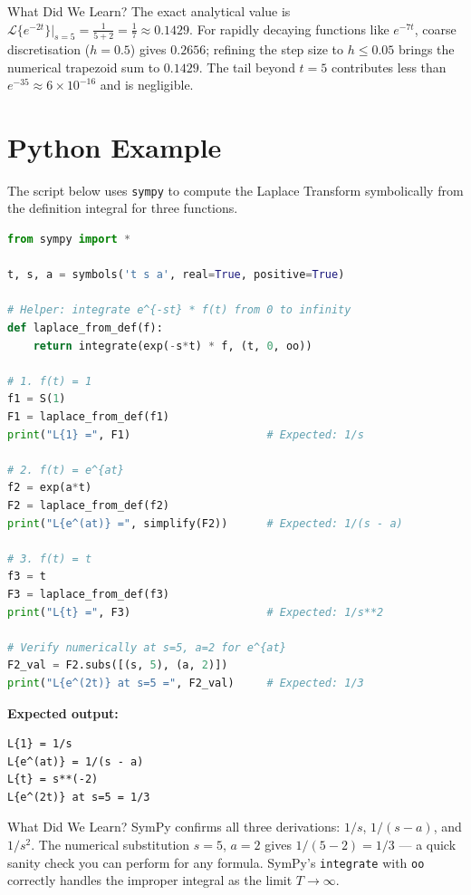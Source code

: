 \documentclass[12pt,a4paper]{article}
\begin{document}
\begin{learnbox}{What Did We Learn?}
The exact analytical value is $\mathcal{L}\{e^{-2t}\}\big|_{s=5} = \frac{1}{5+2} = \frac{1}{7} \approx 0.1429$.
For rapidly decaying functions like $e^{-7t}$, coarse discretisation ($h = 0.5$) gives $0.2656$; refining the step size to $h \le 0.05$ brings the numerical trapezoid sum to $0.1429$. The tail beyond $t = 5$ contributes less than $e^{-35} \approx 6 \times 10^{-16}$ and is negligible.
\end{learnbox}

\section{Python Example}

The script below uses \texttt{sympy} to compute the Laplace Transform
symbolically from the definition integral for three functions.

\begin{lstlisting}[language=Python, caption={Symbolic Laplace Transform via SymPy}]
from sympy import *

t, s, a = symbols('t s a', real=True, positive=True)

# Helper: integrate e^{-st} * f(t) from 0 to infinity
def laplace_from_def(f):
    return integrate(exp(-s*t) * f, (t, 0, oo))

# 1. f(t) = 1
f1 = S(1)
F1 = laplace_from_def(f1)
print("L{1} =", F1)                     # Expected: 1/s

# 2. f(t) = e^{at}
f2 = exp(a*t)
F2 = laplace_from_def(f2)
print("L{e^(at)} =", simplify(F2))      # Expected: 1/(s - a)

# 3. f(t) = t
f3 = t
F3 = laplace_from_def(f3)
print("L{t} =", F3)                     # Expected: 1/s**2

# Verify numerically at s=5, a=2 for e^{at}
F2_val = F2.subs([(s, 5), (a, 2)])
print("L{e^(2t)} at s=5 =", F2_val)     # Expected: 1/3
\end{lstlisting}

\medskip
\noindent\textbf{Expected output:}
\begin{verbatim}
L{1} = 1/s
L{e^(at)} = 1/(s - a)
L{t} = s**(-2)
L{e^(2t)} at s=5 = 1/3
\end{verbatim}

\begin{learnbox}{What Did We Learn?}
SymPy confirms all three derivations: $1/s$, $1/(s-a)$, and $1/s^2$.
The numerical substitution $s=5$, $a=2$ gives $1/(5-2)=1/3$ --- a quick
sanity check you can perform for any formula. SymPy's \texttt{integrate}
with \texttt{oo} correctly handles the improper integral as the limit
$T \to \infty$.
\end{learnbox}
\end{document}
